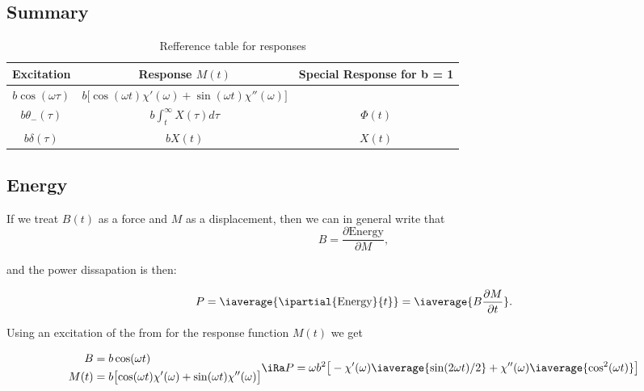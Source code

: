   \subsection{Summary}
  \begin{table}[h]
    \centering
    \caption{Refference table for responses\label{tab:responses}}
    \begin{tabular}{|c|c|c|}
      \hline\textbf{Excitation} & \textbf{Response} $ M(t) $ & \textbf{Special Response for b = 1}\\\hline
      $ b\cos(\omega \tau) $ & $ b\big[{\cos(\omega t)\chi'(\omega)} + {\sin(\omega t)\chi''(\omega)}\big] $ & \\
      $ b\theta_-(\tau) $ & $ b\int_{t}^{\infty}X(\tau)d\tau $ & $ \Phi(t) $\\
      $ b\delta(\tau) $ & $ bX(t) $ & $ X(t) $\\\hline
    \end{tabular}
  \end{table}


\subsection{Energy}
If we treat  $ B(t) $ as a force  and $ M $ as a  displacement, then we
can in general write that
\begin{equation}\label{eqn:energy_1}
  B = \frac{\partial\text{Energy}}{\partial M},
\end{equation}

\noindent and the power dissapation is then:

 \begin{equation}
   P = \iaverage{\ipartial{\text{Energy}}{t}} = \iaverage{B\frac{\partial M}{\partial t}}.
 \end{equation}

 \noindent Using  an excitation of  the from for the  response function
 $ M(t) $ we get

 \begin{equation}
   \begin{aligned}
     B & = b\cos(\omega t)\\
     M(t) & = b\big[{\cos(\omega t)\chi'(\omega)} + {\sin(\omega t)\chi''(\omega)}\big]
   \end{aligned}
   \iRa P = \omega b^2\big[-\chi'(\omega)\iaverage{\sin(2\omega t)/2} + \chi''(\omega)\iaverage{\cos^2(\omega t)}\big]
 \end{equation}

